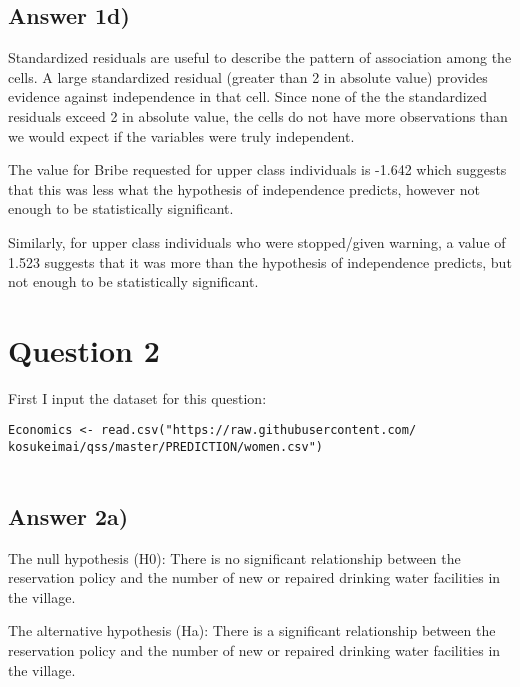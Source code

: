 \documentclass{article}
\begin{document}
\vspace{5cm}

\subsection{Answer 1d)}
Standardized residuals are useful to describe the pattern of association among the cells. A large standardized residual (greater than 2 in absolute value) provides evidence against independence in that cell.
Since none of the the standardized residuals exceed 2 in absolute value, the cells do not have more observations than we would expect if the variables were truly independent. 

The value for Bribe requested for upper class individuals is -1.642 which suggests that this was less what the hypothesis of independence predicts, however not enough to be statistically significant. 

Similarly, for upper class individuals who were stopped/given warning, a value of 1.523 suggests that it was more than the hypothesis of independence predicts, but not enough to be statistically significant. 

\pagebreak
\section{Question 2}
First I input the dataset for this question:
\begin{verbatim}
Economics <- read.csv("https://raw.githubusercontent.com/
kosukeimai/qss/master/PREDICTION/women.csv")
    
\end{verbatim}

\subsection{Answer 2a)}
The null hypothesis (H0): There is no significant relationship between the  reservation policy and the number of new or repaired drinking water facilities in the village.

\noindent The alternative hypothesis (Ha): There is a significant relationship between the  reservation policy and the number of new or repaired drinking water facilities in the village.

\end{document}
